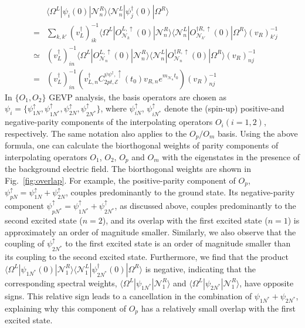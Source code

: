 \documentclass[aps,prl,twocolumn,superscriptaddress,nofootinbib]{revtex4-2}
\newcommand{\bea}{\begin{eqnarray}}
\newcommand{\eea}{\end{eqnarray}}
\newcommand{\mcE}{{\mathcal E}}
\newcommand{\mcN}{{\mathcal N}}
\newcommand{\la}{\langle}
\newcommand{\ra}{\rangle}
\begin{document}
\bea\label{eq:am2}
&&\la \Omega^L |\psi_i(0)|\mathcal{N}_n^R\rangle \langle \mathcal{N}_n^L |\psi^\dagger_j(0)|\Omega^R\rangle
\nonumber\\
&=&\sum_{k,k'}(v^\dagger_L)^{-1}_{ik}\la \Omega^L |O^{L,\uparrow}_{\mathcal{N}_k}(0)|\mathcal{N}_n^R\rangle\langle \mathcal{N}_n^L|O^{\dagger R,\uparrow}_{\mathcal{N}_{k'}}(0)|\Omega^R\rangle (v_R)^{-1}_{k'j}\nonumber\\
&\simeq&(v^\dagger_L)^{-1}_{in}\la \Omega^L |O^{L,\uparrow}_{\mathcal{N}_n}(0)|\mathcal{N}_n^R\rangle\langle \mathcal{N}_n^L|O^{\dagger R,\uparrow}_{\mathcal{N}_{n}}(0)|\Omega^R\rangle (v_R)^{-1}_{nj}
\nonumber\\
&=&(v^\dagger_L)^{-1}_{in}(v^\dagger_{L,n}  C^{\psi\psi^\dag,\uparrow}_{2pt,\mcE}(t_0)v_{R,n}e^{m_{\mcN_n}t_0})(v_R)^{-1}_{nj}
\eea
In $\{O_1,O_2\}$ GEVP analysis, the basis operators are chosen as $\psi_i=\{\psi^\uparrow_{1N},\psi^\uparrow_{1N^*},\psi^\uparrow_{2N},\psi^\uparrow_{2N^*}\}$, where $\psi^\uparrow_{iN}$, $\psi^\uparrow_{iN^*}$ denote the (spin-up) positive-and negative-parity components of the interpolating operators $O_i (i=1,2)$, respectively. The same notation also applies to the $O_p/O_m$ basis.
%
Using the above formula, one can calculate the biorthogonal weights of parity components of interpolating operators $O_1$, $O_2$, $O_p$ and $O_m$ with the eigenstates in the presence of the background electric field. 
The biorthogonal weights are shown in Fig.~\ref{fig:overlap}.
For example, the positive-parity component of $O_p$, $\psi^\uparrow_{pN}=\psi^\uparrow_{1N}+\psi^\uparrow_{2N}$, couples predominantly to the ground state.
Its negative-parity component
$\psi^\uparrow_{pN^*}=\psi^\uparrow_{1N^*}+\psi^\uparrow_{2N^*}$, as discussed above, couples predominantly to the second excited state ($n=2$), and its overlap with the first excited state ($n=1$) is approximately an order of magnitude smaller. 
Similarly, we also observe that the coupling of $\psi^\uparrow_{2N^*}$ to the first excited state is an order of magnitude smaller than its coupling to the second excited state. 
Furthermore, we find that the product $\la \Omega^L |\psi_{1N^*}(0)|\mathcal{N}_1^R\rangle \langle \mathcal{N}_1^L |\psi^\dagger_{2N^*}(0)|\Omega^R\rangle$ is negative, indicating that the corresponding spectral weights, $\la \Omega^L|\psi_{1N^*}|\mcN_1^R\ra$ and $\la \Omega^L|\psi_{2N^*}|\mcN_1^R\ra$, have opposite signs.
This relative sign leads to a cancellation in the combination of $\psi_{1N^*}+\psi_{2N^*}$, explaining why this component of $O_p$ has a relatively small overlap with the first excited state. 
\end{document}
